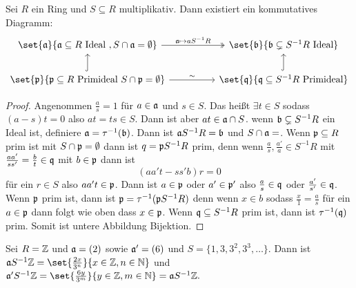 \begin{Satz}
    Sei $R$ ein Ring und $S\subseteq R$ multiplikativ. Dann existiert ein kommutatives Diagramm:
    $$%
\begin{tikzcd}
{\set{\fraka}{\fraka\subseteq R \text{ Ideal }, S\cap\fraka=\emptyset}} \arrow[rr, "\fraka\mapsto aS^{-1}R", two heads] &  & \set{\frakb}{\frakb\subsetneq S^{-1}R \text{ Ideal}}                   \\
\set{\frakp}{\frakp\subseteq R \text{ Primideal } S\cap\frakp=\emptyset} \arrow[rr, "\sim"] \arrow[u, hook]             &  & \set{\frakq}{\frakq\subseteq S^{-1}R \text{ Primideal}} \arrow[u, hook]
\end{tikzcd}$$
\end{Satz}
\begin{proof}
    Angenommen $\frac a s=1$ für $a\in\mathfrak{a}$ und $s\in S$. Das heißt $\exists t\in S$ sodass $(a-s)t=0$ also $at=ts\in S$. Dann ist aber $at\in \mathfrak{a}\cap S$.
    wenn $\mathfrak{b}\subsetneq S^{-1}R$ ein Ideal ist, definiere $\mathfrak{a}=\tau^{-1}(\mathfrak{b})$. Dann ist $\mathfrak{a} S^{-1}R=\mathfrak{b}$ und $S\cap\fraka=\empty$.
    Wenn $\mathfrak{p}\subseteq R$ prim ist mit $S\cap\mathfrak{p}=\emptyset$ dann ist $q=\mathfrak{p} S^{-1}R$ prim, denn wenn $\frac a s,\frac{a'}{a}\in S^{-1}R$ mit $\frac{aa'}{ss'}=\frac b t\in \mathfrak{q}$ mit $b\in\mathfrak{p}$ dann ist 
    $$(aa't-ss'b)r=0$$ für ein $r\in S$ also $aa't\in \mathfrak{p}$. Dann ist $a\in\mathfrak{p}$ oder $a'\in\mathfrak{p}'$ also $\frac a s\in\mathfrak{q}$ oder $\frac{a'}{s'}\in\mathfrak{q}$.
    Wenn $\mathfrak{p}$ prim ist, dann ist $\mathfrak{p}=\tau^{-1}(\mathfrak{p} S^{-1}R)$ denn wenn $x\in b$ sodass $\frac x 1=\frac a s$ für ein $a\in\mathfrak{p}$ dann folgt wie oben dass $x\in\mathfrak{p}$.
    Wenn $\mathfrak{q}\subseteq S^{-1}R$ prim ist, dann ist $\tau^{-1}(\mathfrak{q})$ prim. Somit ist untere Abbildung Bijektion.
    
\end{proof}
\begin{Bsp}
    Sei $R=\mathbb{Z}$ und $\mathfrak{a}=(2)$ sowie $\mathfrak{a}'=(6)$ und $S=\{1,3,3^2,3^3,\dots\}$. Dann ist $\fraka S^{-1}\ZZ=\set{\frac{2x}{3^n}}{x\in\ZZ, n\in\NN}$ und $\fraka'S^{-1}\ZZ=\set{\frac{6y}{3^m}}{y\in\ZZ, m\in \NN}=\fraka S^{-1}\ZZ.$
\end{Bsp}
